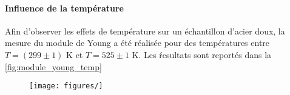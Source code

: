 \paragraph{Influence de la température} Afin d'observer les effets de température sur un échantillon d'acier doux, la mesure du module de Young a été réalisée pour des températures entre \(T = (299 \pm 1)\) \si{\kelvin} et \(T = 525 \pm 1\) \si{\kelvin}. Les ŕesultats sont reportés dans la \autoref{fig:module_young_temp}

\begin{figure}[]
    \centering
    \texttt{[image: figures/]}
\end{figure}